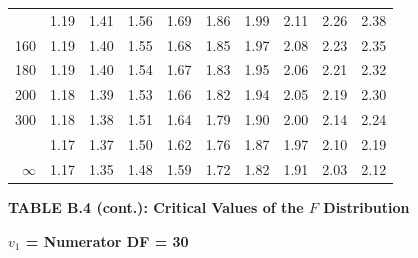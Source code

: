 \documentclass[10pt]{article}
\begin{document}
\begin{longtable}{@{}r!{\vrule width 0.8pt\hspace{0.55em}}rrrrrrrrr@{}}
 & 1.19 & 1.41 & 1.56 & 1.69 & 1.86 & 1.99 & 2.11 & 2.26 & 2.38 \\
160 & 1.19 & 1.40 & 1.55 & 1.68 & 1.85 & 1.97 & 2.08 & 2.23 & 2.35 \\
180 & 1.19 & 1.40 & 1.54 & 1.67 & 1.83 & 1.95 & 2.06 & 2.21 & 2.32 \\
200 & 1.18 & 1.39 & 1.53 & 1.66 & 1.82 & 1.94 & 2.05 & 2.19 & 2.30 \\
300 & 1.18 & 1.38 & 1.51 & 1.64 & 1.79 & 1.90 & 2.00 & 2.14 & 2.24 \\
 & 1.17 & 1.37 & 1.50 & 1.62 & 1.76 & 1.87 & 1.97 & 2.10 & 2.19 \\
$\infty$ & 1.17 & 1.35 & 1.48 & 1.59 & 1.72 & 1.82 & 1.91 & 2.03 & 2.12 \\
\end{longtable}
\newpage
\thispagestyle{empty}
\begin{center}
{\large\bfseries TABLE B.4 (cont.): Critical Values of the $F$ Distribution\par}
\end{center}
{\large\bfseries $v_1$ = Numerator DF = 30\par}
\vspace{0.5em}
\small
\end{document}
